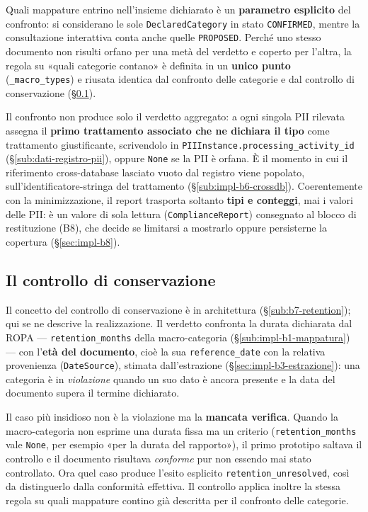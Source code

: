 Quali mappature entrino nell'insieme dichiarato è un \textbf{parametro esplicito} del confronto: si considerano le sole \texttt{DeclaredCategory} in stato \texttt{CONFIRMED}, mentre la consultazione interattiva conta anche quelle \texttt{PROPOSED}. Perché uno stesso documento non risulti orfano per una metà del verdetto e coperto per l'altra, la regola su «quali categorie contano» è definita in un \textbf{unico punto} (\texttt{\_macro\_types}) e riusata identica dal confronto delle categorie e dal controllo di conservazione (§\ref{sub:impl-b7-retention}).

Il confronto non produce solo il verdetto aggregato: a ogni singola PII rilevata assegna il \textbf{primo trattamento associato che ne dichiara il tipo} come trattamento giustificante, scrivendolo in \texttt{PIIInstance.processing\_activity\_id} (§\ref{sub:dati-registro-pii}), oppure \texttt{None} se la PII è orfana. È il momento in cui il riferimento cross-database lasciato vuoto dal registro viene popolato, sull'identificatore-stringa del trattamento (§\ref{sub:impl-b6-crossdb}). Coerentemente con la minimizzazione, il report trasporta soltanto \textbf{tipi e conteggi}, mai i valori delle PII: è un valore di sola lettura (\texttt{ComplianceReport}) consegnato al blocco di restituzione (B8), che decide se limitarsi a mostrarlo oppure persisterne la copertura (§\ref{sec:impl-b8}).

\subsection{Il controllo di conservazione}
\label{sub:impl-b7-retention}

Il concetto del controllo di conservazione è in architettura (§\ref{sub:b7-retention}); qui se ne descrive la realizzazione. Il verdetto confronta la durata dichiarata dal ROPA --- \texttt{retention\_months} della macro-categoria (§\ref{sub:impl-b1-mappatura}) --- con l'\textbf{età del documento}, cioè la sua \texttt{reference\_date} con la relativa provenienza (\texttt{DateSource}), stimata dall'estrazione (§\ref{sec:impl-b3-estrazione}): una categoria è in \emph{violazione} quando un suo dato è ancora presente e la data del documento supera il termine dichiarato.

Il caso più insidioso non è la violazione ma la \textbf{mancata verifica}. Quando la macro-categoria non esprime una durata fissa ma un criterio (\texttt{retention\_months} vale \texttt{None}, per esempio «per la durata del rapporto»), il primo prototipo saltava il controllo e il documento risultava \emph{conforme} pur non essendo mai stato controllato. Ora quel caso produce l'esito esplicito \texttt{retention\_unresolved}, così da distinguerlo dalla conformità effettiva. Il controllo applica inoltre la stessa regola su quali mappature contino già descritta per il confronto delle categorie.

